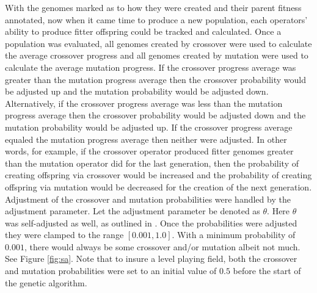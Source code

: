 With the genomes marked as to how they were created and their parent fitness annotated, now when it came time to produce a new population, each operators' ability to produce fitter offspring could be tracked and calculated. Once a population was evaluated, all genomes created by crossover were used to calculate the average crossover progress and all genomes created by mutation were used to calculate the average mutation progress. If the crossover progress average was greater than the mutation progress average then the crossover probability would be adjusted up and the mutation probability would be adjusted down. Alternatively, if the crossover progress average was less than the mutation progress average then the crossover probability would be adjusted down and the mutation probability would be adjusted up. If the crossover progress average equaled the mutation progress average then neither were adjusted. In other words, for example, if the crossover operator produced fitter genomes greater than the mutation operator did for the last generation, then the probability of creating offspring via crossover would be increased and the probability of creating offspring via mutation would be decreased for the creation of the next generation. Adjustment of the crossover and mutation probabilities were handled by the adjustment parameter. Let the adjustment parameter be denoted as $\theta$. Here $\theta$ was self-adjusted as well, as outlined in \cite{self_adapt}. Once the probabilities were adjusted they were clamped to the range $[0.001,1.0]$. With a minimum probability of $0.001$, there would always be some crossover and/or mutation albeit not much. See Figure \ref{fig:sa}. Note that to insure a level playing field, both the crossover and mutation probabilities were set to an initial value of $0.5$ before the start of the genetic algorithm.

\renewcommand{\baselinestretch}{1.0}

